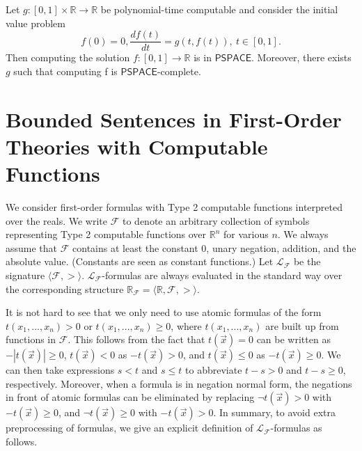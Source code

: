 \documentclass[prodmode]{acmsmall} %
\begin{document}
\begin{proposition}
Let $g:[0,1]\times \mathbb{R}\rightarrow \mathbb{R}$ be polynomial-time computable and consider the initial value problem 
$$f(0) = 0, \frac{df(t)}{dt} = g(t, f(t)),\ t\in [0,1].$$
Then computing the solution $f:[0,1]\rightarrow \mathbb{R}$ is in $\mathsf{PSPACE}$. Moreover, there exists $g$ such that computing f is $\mathsf{PSPACE}$-complete. 
\end{proposition}

\section{Bounded Sentences in First-Order Theories with Computable Functions}\label{logic}

We consider first-order formulas with Type 2 computable functions interpreted over the reals. We write $\mathcal{F}$ to denote an arbitrary collection of symbols representing Type 2 computable functions over $\mathbb{R}^n$ for various $n$. We always assume that $\mathcal{F}$ contains at least the constant $0$, unary negation, addition, and the absolute value. (Constants are seen as constant functions.) Let $\mathcal{L_{\mathcal{F}}}$ be the signature $\langle \mathcal{F}, >\rangle$. $\mathcal{L}_{\mathcal{F}}$-formulas are always evaluated in the standard way over the corresponding structure $\mathbb{R}_{\mathcal{F}}= \langle \mathbb{R}, \mathcal{F}, >\rangle$.  

It is not hard to see that we only need to use atomic formulas of the form $t(x_1,...,x_n)>0$ or $t(x_1,...,x_n)\geq 0$, where $t(x_1,...,x_n)$ are built up from functions in $\mathcal{F}$. This follows from the fact that $t(\vec x)=0$ can be written as $-|t(\vec x)|\geq 0$, $t(\vec x)<0$ as $-t(\vec x)>0$, and $t(\vec x)\leq 0$ as $-t(\vec x)\geq 0$. We can then take expressions $s <t $ and $s \leq t$ to abbreviate $t - s > 0$ and $t - s \geq 0$, respectively. Moreover, when a formula is in negation normal form, the negations in front of atomic formulas can be eliminated by replacing $\neg t(\vec x) > 0$ with $-t(\vec x)\geq 0$, and $\neg t(\vec x)\geq 0$ with $-t(\vec x)>0$. In summary, to avoid extra preprocessing of formulas, we give an explicit definition of $\mathcal{L}_{\mathcal{F}}$-formulas as follows.
\end{document}
